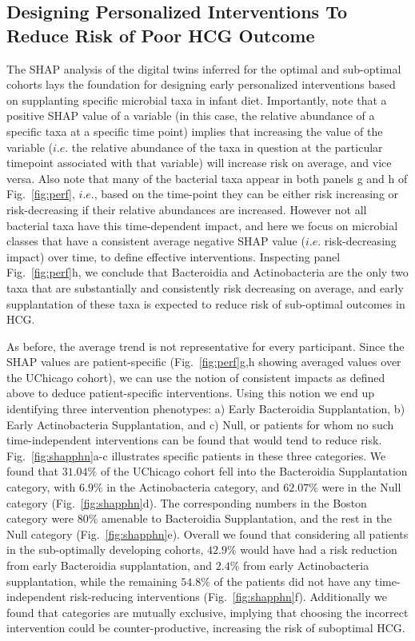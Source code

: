 \documentclass[onecolumn,10pt]{IEEEtran}
\def\bact{Bacteroidia\xspace}
\def\actn{Actinobacteria\xspace}
\begin{document}
\subsection*{Designing Personalized Interventions To Reduce Risk of Poor HCG Outcome}
The SHAP analysis of the digital twins inferred for the optimal and sub-optimal cohorts lays the foundation for designing early personalized interventions based on supplanting specific microbial taxa in infant diet. Importantly, note that a positive SHAP value of a variable (in this case, the relative abundance of a specific taxa at a specific time point) implies that increasing the value of the variable ($i.e.$ the relative abundance of the taxa in question at the particular timepoint associated with that variable) will increase risk on average, and vice versa. Also note that many of the bacterial taxa appear in both panels g and h of Fig.~\ref{fig:perf}, $i.e.$, based on the time-point they can be either risk increasing or risk-decreasing if their relative abundances are increased. However not all bacterial taxa have this time-dependent impact, and here we focus on microbial classes that have a consistent average negative SHAP value ($i.e.$ risk-decreasing impact) over time, to define effective interventions. Inspecting panel Fig.~\ref{fig:perf}h, we conclude that \bact and \actn are the only two taxa that are substantially and consistently risk decreasing on average, and early supplantation of these taxa is expected to reduce risk of sub-optimal outcomes in HCG.

As before, the average trend is not representative for every participant. Since the SHAP values are patient-specific (Fig.~\ref{fig:perf}g,h showing averaged values over the UChicago cohort),  we can use the notion of consistent impacts as defined above to deduce patient-specific interventions. Using this notion we end up identifying three intervention  phenotypes: a) Early \bact Supplantation, b) Early \actn Supplantation, and c) Null, or patients for whom  no such time-independent interventions can be found that would tend to reduce risk. Fig.~\ref{fig:shapphn}a-c illustrates specific patients in these three categories. We found that $31.04\%$ of the UChicago cohort fell into the \bact Supplantation category, with $6.9\%$ in the \actn category, and $62.07\%$ were in the Null category (Fig.~\ref{fig:shapphn}d). The corresponding numbers in the Boston category were $80\%$ amenable to \bact Supplantation, and the rest in the Null category (Fig.~\ref{fig:shapphn}e). Overall we found that considering all patients in the sub-optimally developing cohorts, $42.9\%$ would have had a risk reduction from early \bact supplantation, and $2.4\%$ from early \actn supplantation, while the remaining $54.8\%$ of the patients did not have any time-independent risk-reducing interventions (Fig.~\ref{fig:shapphn}f). Additionally we found that categories are mutually exclusive, implying that choosing the incorrect intervention could be counter-productive, increasing the risk of suboptimal HCG.
\end{document}
